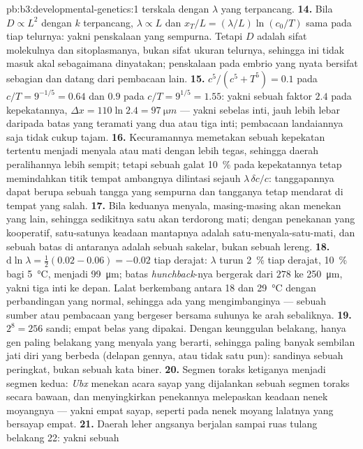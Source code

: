 \begin{solution}{pb:b3:developmental-genetics:1}
terskala dengan $\lambda$ yang terpancang.
\textbf{14.} Bila $D \propto L^{2}$ dengan $k$ terpancang, $\lambda \propto L$ dan
$x_{T}/L = (\lambda/L)\ln(c_{0}/T)$ sama pada tiap telurnya: yakni penskalaan yang
sempurna. Tetapi $D$ adalah sifat molekulnya dan sitoplasmanya, bukan sifat
ukuran telurnya, sehingga ini tidak masuk akal sebagaimana dinyatakan; penskalaan pada embrio
yang nyata bersifat sebagian dan datang dari pembacaan lain.
\textbf{15.} $c^{5}/(c^{5} + T^{5}) = 0.1$ pada $c/T = 9^{-1/5} = 0.64$ dan
$0.9$ pada $c/T = 9^{1/5} = 1.55$: yakni sebuah faktor $2.4$ pada kepekatannya,
$\Delta x = 110\ln 2.4 = \qty{97}{\micro m}$ --- yakni sebelas inti, jauh
lebih lebar daripada batas yang teramati yang dua atau tiga inti; pembacaan landaiannya
saja tidak cukup tajam.
\textbf{16.} Kecuramannya memetakan sebuah kepekatan tertentu menjadi menyala atau mati dengan lebih
tegas, sehingga daerah peralihannya lebih sempit; tetapi sebuah galat \qty{10}{\%}
pada kepekatannya tetap memindahkan titik tempat ambangnya
dilintasi sejauh $\lambda\,\delta c/c$: tanggapannya dapat berupa sebuah tangga yang sempurna
dan tangganya tetap mendarat di tempat yang salah.
\textbf{17.} Bila keduanya menyala, masing-masing akan menekan yang lain, sehingga
sedikitnya satu akan terdorong mati; dengan penekanan yang kooperatif, satu-satunya
keadaan mantapnya adalah satu-menyala-satu-mati, dan sebuah batas di antaranya adalah sebuah
sakelar, bukan sebuah lereng.
\textbf{18.} $\mathrm{d}\ln\lambda = \tfrac{1}{2}(0.02 - 0.06) = -0.02$
tiap derajat: $\lambda$ turun \qty{2}{\%} tiap derajat, \qty{10}{\%} bagi
\qty{5}{\celsius}, menjadi \qty{99}{\micro m}; batas \emph{hunchback}-nya
bergerak dari $278$ ke \qty{250}{\micro m}, yakni tiga inti ke depan.
Lalat berkembang antara \qty{18}{} dan \qty{29}{\celsius} dengan perbandingan yang normal,
sehingga ada yang mengimbanginya --- sebuah sumber atau pembacaan yang
bergeser bersama suhunya ke arah sebaliknya.
\textbf{19.} $2^{8} = 256$ sandi; empat belas yang dipakai. Dengan keunggulan
belakang, hanya gen paling belakang yang menyala yang berarti, sehingga paling banyak sembilan
jati diri yang berbeda (delapan gennya, atau tidak satu pun): sandinya sebuah peringkat, bukan
sebuah kata biner.
\textbf{20.} Segmen toraks ketiganya menjadi segmen kedua: \emph{Ubx}
menekan acara sayap yang dijalankan sebuah segmen toraks secara bawaan,
dan menyingkirkan penekannya melepaskan keadaan nenek moyangnya --- yakni empat sayap,
seperti pada nenek moyang lalatnya yang bersayap empat.
\textbf{21.} Daerah leher angsanya berjalan sampai ruas tulang belakang 22: yakni sebuah

\end{solution}
